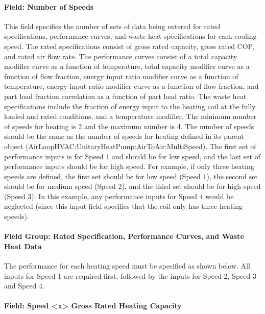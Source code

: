 \paragraph{Field: Number of Speeds}\label{field-number-of-speeds-2}

This field specifies the number of sets of data being entered for rated specifications, performance curves, and waste heat specifications for each cooling speed. The rated specifications consist of gross rated capacity, gross rated COP, and rated air flow rate. The performance curves consist of a total capacity modifier curve as a function of temperature, total capacity modifier curve as a function of flow fraction, energy input ratio modifier curve as a function of temperature, energy input ratio modifier curve as a function of flow fraction, and part load fraction correlation as a function of part load ratio. The waste heat specifications include the fraction of energy input to the heating coil at the fully loaded and rated conditions, and a temperature modifier. The minimum number of speeds for heating is 2 and the maximum number is 4. The number of speeds should be the same as the number of speeds for heating defined in its parent object (AirLoopHVAC:UnitaryHeatPump:AirToAir:MultiSpeed). The first set of performance inputs is for Speed 1 and should be for low speed, and the last set of performance inputs should be for high speed. For example, if only three heating speeds are defined, the first set should be for low speed (Speed 1), the second set should be for medium speed (Speed 2), and the third set should be for high speed (Speed 3). In this example, any performance inputs for Speed 4 would be neglected (since this input field specifies that the coil only has three heating speeds).

\paragraph{Field Group: Rated Specification, Performance Curves, and Waste Heat Data}\label{field-group-rated-specification-performance-curves-and-waste-heat-data}

The performance for each heating speed must be specified as shown below. All inputs for Speed 1 are required first, followed by the inputs for Speed 2, Speed 3 and Speed 4.

\paragraph{Field: Speed \textless{}x\textgreater{} Gross Rated Heating Capacity}\label{field-speed-x-gross-rated-heating-capacity}

